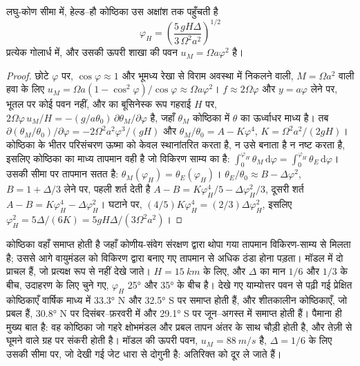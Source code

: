 \begin{theorem}[हैडली कोष्ठिका का विस्तार]\label{thm:b3:atmospheric-dynamics:held-hou}
लघु-कोण सीमा में, हेल्ड--हौ कोष्ठिका उस अक्षांश तक पहुँचती है
\[
\varphi_H = \left(\frac{5\,gH\Delta}{3\,\Omega^2a^2}\right)^{1/2}
\]
प्रत्येक गोलार्ध में, और उसकी ऊपरी शाखा की पवन $u_M = \Omega
a\varphi^2$ है।
\end{theorem}

\begin{proof}
छोटे $\varphi$ पर, $\cos\varphi \approx 1$ और भूमध्य रेखा से विराम अवस्था में
निकलने वाली, $M = \Omega a^2$ वाली हवा के लिए $u_M = \Omega a(1 - \cos^2\varphi)/\cos\varphi
\approx \Omega a\varphi^2$। $f \approx 2\Omega\varphi$ और $y = a\varphi$ लेने पर,
भूतल पर कोई पवन नहीं, और  का बूसिनेस्क रूप
गहराई $H$ पर, $2\Omega\varphi\,u_M/H = -(g/a\theta_0)\,\partial\theta_M/
\partial\varphi$ है, जहाँ $\theta_M$ कोष्ठिका में $\theta$ का ऊर्ध्वाधर माध्य है।
तब $\partial(\theta_M/\theta_0)/\partial\varphi = -2\Omega^2a^2
\varphi^3/(gH)$ और $\theta_M/\theta_0 = A - K\varphi^4$, $K = \Omega^2a^2/
(2gH)$। कोष्ठिका के भीतर परिसंचरण ऊष्मा को केवल स्थानांतरित करता है, न उसे बनाता है न
नष्ट करता है, इसलिए कोष्ठिका का माध्य तापमान वही है जो विकिरण
साम्य का है: $\int_0^{\varphi_H}\theta_M\,\mathrm d\varphi = \int_0^{\varphi_H}
\theta_E\,\mathrm d\varphi$। उसकी सीमा पर तापमान सतत है:
$\theta_M(\varphi_H) = \theta_E(\varphi_H)$। $\theta_E/\theta_0 \approx
B - \Delta\varphi^2$, $B = 1 + \Delta/3$ लेने पर, पहली शर्त देती है $A - B =
K\varphi_H^4/5 - \Delta\varphi_H^2/3$, दूसरी शर्त $A - B = K\varphi_H^4 -
\Delta\varphi_H^2$। घटाने पर, $(4/5)K\varphi_H^4 = (2/3)\Delta
\varphi_H^2$, इसलिए $\varphi_H^2 = 5\Delta/(6K) = 5gH\Delta/(3\Omega^2a^2)$।
\end{proof}

कोष्ठिका वहाँ समाप्त होती है जहाँ कोणीय-संवेग संरक्षण द्वारा थोपा गया तापमान
विकिरण-साम्य से मिलता है; उससे आगे वायुमंडल को
विकिरण द्वारा बनाए गए तापमान से अधिक ठंडा होना पड़ता। मॉडल में दो प्राचल हैं, जो
प्रत्यक्ष रूप से नहीं देखे जाते। $H = \qty{15}{km}$ के लिए, और $\Delta$ का मान $1/6$ और
$1/3$ के बीच, उदाहरण के लिए चुने गए, $\varphi_H$ \ang{25} और \ang{35} के बीच है। देखे गए
 याम्योत्तर पवन से पढ़ी गई प्रेक्षित कोष्ठिकाएँ वार्षिक माध्य में
\ang{33.3} N और \ang{32.5} S पर समाप्त होती हैं, और शीतकालीन कोष्ठिकाएँ,
जो प्रबल हैं, \ang{30.8} N पर दिसंबर--फ़रवरी में और \ang{29.1} S पर
जून--अगस्त में समाप्त होती हैं। पैमाना ही मुख्य बात है: वह कोष्ठिका जो गहरे क्षोभमंडल
और प्रबल तापन अंतर के साथ चौड़ी होती है, और तेज़ी से घूमने वाले ग्रह पर
संकरी होती है। मॉडल की ऊपरी पवन, $u_M =
\qty{88}{m/s}$ है, $\Delta = 1/6$ के लिए उसकी सीमा पर, जो देखी गई
जेट धारा से दोगुनी है: अतिरिक्त को  दूर ले जाते हैं।

